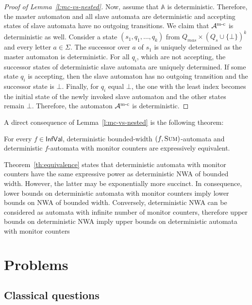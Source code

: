 \documentclass{lmcs}
\newcommand{\nestedA}{\mathbb{A}}
\newcommand{\fsum}{\textsc{Sum}}
\newcommand{\InfVal}{\mathsf{InfVal}}
\begin{document}
\begin{proof}[Proof of Lemma~\ref{l:mc-vs-nested}]
Now, assume that $\nestedA$ is deterministic. Therefore, the master automaton and all slave automata are deterministic and accepting states of slave automata have no outgoing transitions.
We claim that $\mathcal{A}^{\textrm{m-c}}$ is deterministic as well.
Consider a state $(s_1, q_1, \ldots, q_k)$ from $Q_{mas} \times {(Q_{s} \cup \{ \bot \})}^k$ and every letter $a \in \Sigma$.
The successor over $a$ of $s_1$ is uniquely determined as the master automaton is deterministic.
For all $q_i$, which are not accepting, the successor states of deterministic slave automata are uniquely determined.
If some state $q_i$ is accepting, then the slave automaton has no outgoing transition and the successor state is $\bot$.
Finally, for $q_i$ equal $\bot$, the one with the least index becomes the initial state of the newly invoked slave automaton and
the other states remain $\bot$.
Therefore, the automaton $\mathcal{A}^{\textrm{m-c}}$ is deterministic.
\end{proof}

A direct consequence of Lemma~\ref{l:mc-vs-nested}  is the following theorem:

\begin{thm}\label{th:equivalence}
For every  $f \in \InfVal$, deterministic
bounded-width $(f,\fsum)$-automata and deterministic $f$-automata with monitor counters are expressively equivalent.
\end{thm}

\begin{rem}[Discussion]
Theorem~\ref{th:equivalence}
 states that deterministic automata with monitor counters have
the same expressive power as deterministic NWA of bounded width. However, the latter may be exponentially more succinct.
In consequence, lower bounds on deterministic automata with monitor counters imply lower bounds on NWA of bounded width.
Conversely, deterministic NWA can be considered as automata with infinite number of monitor counters, therefore
upper bounds on deterministic NWA imply upper bounds on deterministic automata with monitor counters
\end{rem}


\section{Problems}
\subsection{Classical questions}
\end{document}
